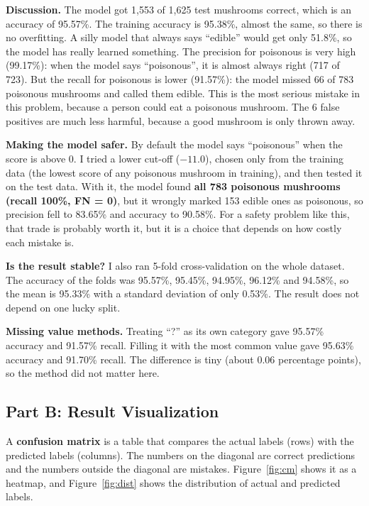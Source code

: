 \documentclass[12pt,a4paper]{article}
\begin{document}
\textbf{Discussion.} The model got 1,553 of 1,625 test mushrooms correct, which is an accuracy of 95.57\%. The training accuracy is 95.38\%, almost the same, so there is no overfitting. A silly model that always says ``edible'' would get only 51.8\%, so the model has really learned something. The precision for poisonous is very high (99.17\%): when the model says ``poisonous'', it is almost always right (717 of 723). But the recall for poisonous is lower (91.57\%): the model missed 66 of 783 poisonous mushrooms and called them edible. This is the most serious mistake in this problem, because a person could eat a poisonous mushroom. The 6 false positives are much less harmful, because a good mushroom is only thrown away.

\textbf{Making the model safer.} By default the model says ``poisonous'' when the score is above 0. I tried a lower cut-off ($-11.0$), chosen only from the training data (the lowest score of any poisonous mushroom in training), and then tested it on the test data. With it, the model found \textbf{all 783 poisonous mushrooms (recall 100\%, FN = 0)}, but it wrongly marked 153 edible ones as poisonous, so precision fell to 83.65\% and accuracy to 90.58\%. For a safety problem like this, that trade is probably worth it, but it is a choice that depends on how costly each mistake is.

\textbf{Is the result stable?} I also ran 5-fold cross-validation on the whole dataset. The accuracy of the folds was 95.57\%, 95.45\%, 94.95\%, 96.12\% and 94.58\%, so the mean is 95.33\% with a standard deviation of only 0.53\%. The result does not depend on one lucky split.

\textbf{Missing value methods.} Treating ``?'' as its own category gave 95.57\% accuracy and 91.57\% recall. Filling it with the most common value gave 95.63\% accuracy and 91.70\% recall. The difference is tiny (about 0.06 percentage points), so the method did not matter here.

\subsection{Part B: Result Visualization}
A \textbf{confusion matrix} is a table that compares the actual labels (rows) with the predicted labels (columns). The numbers on the diagonal are correct predictions and the numbers outside the diagonal are mistakes. Figure~\ref{fig:cm} shows it as a heatmap, and Figure~\ref{fig:dist} shows the distribution of actual and predicted labels.
\end{document}
